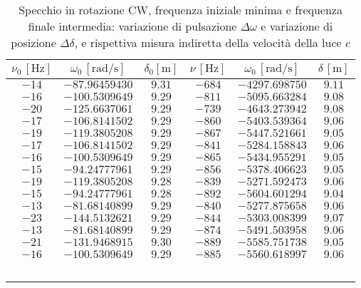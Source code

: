 \documentclass[]{article}
\begin{document}
\begin {table}
\centering

 \begin{tabular}{||c|c|c||c|c|c||}
    \hline
    $\nu_0\, [\text{Hz}] $ & $\omega_0\, [\text{rad/s}] $ & $\delta_0 [\text{m}] $ & $\nu\, [\text{Hz}] $ & $\omega_0\, [\text{rad/s}] $ & $\delta\, [\text{m}] $ \\
    \hline\hline
    $-14$ & $-87.96459430 $ & $9.31$ & $-684$ & $-4297.698750$ & $9.11$\\\hline
    $-16$ & $-100.5309649 $ & $9.29$ & $-811$ & $-5095.663284$ & $9.08$\\\hline
    $-20$ & $-125.6637061 $ & $9.29$ & $-739$ & $-4643.273942$ & $9.08$\\\hline
    $-17$ & $-106.8141502 $ & $9.29$ & $-860$ & $-5403.539364$ & $9.06$\\\hline
    $-19$ & $-119.3805208 $ & $9.29$ & $-867$ & $-5447.521661$ & $9.05$\\\hline
    $-17$ & $-106.8141502 $ & $9.29$ & $-841$ & $-5284.158843$ & $9.06$\\\hline
    $-16$ & $-100.5309649 $ & $9.29$ & $-865$ & $-5434.955291$ & $9.05$\\\hline
    $-15$ & $-94.24777961 $ & $9.29$ & $-856$ & $-5378.406623$ & $9.05$\\\hline
    $-19$ & $-119.3805208 $ & $9.28$ & $-839$ & $-5271.592473$ & $9.06$\\\hline
    $-15$ & $-94.24777961 $ & $9.28$ & $-892$ & $-5604.601294$ & $9.04$\\\hline
    $-13$ & $-81.68140899 $ & $9.29$ & $-840$ & $-5277.875658$ & $9.06$\\\hline
    $-23$ & $-144.5132621 $ & $9.29$ & $-844$ & $-5303.008399$ & $9.07$\\\hline
    $-13$ & $-81.68140899 $ & $9.29$ & $-874$ & $-5491.503958$ & $9.06$\\\hline
    $-21$ & $-131.9468915 $ & $9.30$ & $-889$ & $-5585.751738$ & $9.05$\\\hline
    $-16$ & $-100.5309649 $ & $9.29$ & $-885$ & $-5560.618997$ & $9.06$\\\hline

   \end{tabular}
\caption{Specchio in rotazione CW, frequenza iniziale minima e frequenza finale intermedia: variazione di pulsazione $\Delta\omega$ e variazione di posizione $\Delta\delta$, e rispettiva misura indiretta della velocità della luce $c$}

\label{CW_min_mid}
\end{table}
\end{document}
